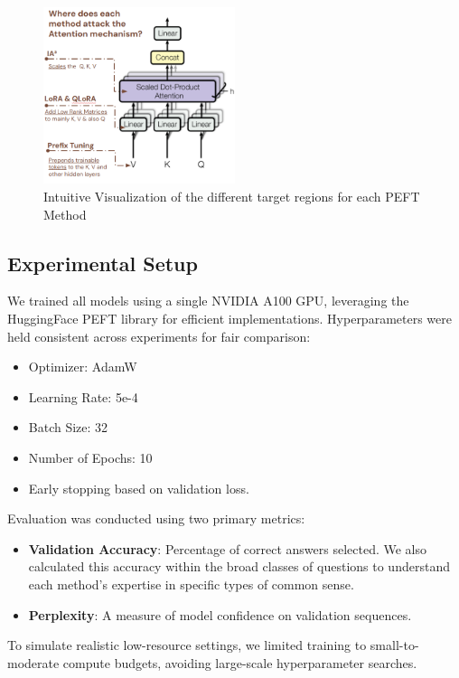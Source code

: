\documentclass[11pt,twocolumn]{article}
\begin{document}
\begin{figure}[h]
\centering
\includegraphics[width=0.5\textwidth]{../graphs/PEFTs.png}
\caption{Intuitive Visualization of the different target regions for each PEFT Method}
\label{fig:peft-target}
\end{figure}

\subsection{Experimental Setup}
We trained all models using a single NVIDIA A100 GPU, leveraging the HuggingFace PEFT library for efficient implementations. Hyperparameters were held consistent across experiments for fair comparison:
\begin{itemize}
    \item Optimizer: AdamW
    \item Learning Rate: 5e-4
    \item Batch Size: 32
    \item Number of Epochs: 10
    \item Early stopping based on validation loss.
\end{itemize}

Evaluation was conducted using two primary metrics:
\begin{itemize}
    \item \textbf{Validation Accuracy}: Percentage of correct answers selected. We also calculated this accuracy within the broad classes of questions to understand each method's expertise in specific types of common sense.
    \item \textbf{Perplexity}: A measure of model confidence on validation sequences.
\end{itemize}

To simulate realistic low-resource settings, we limited training to small-to-moderate compute budgets, avoiding large-scale hyperparameter searches.
\end{document}
